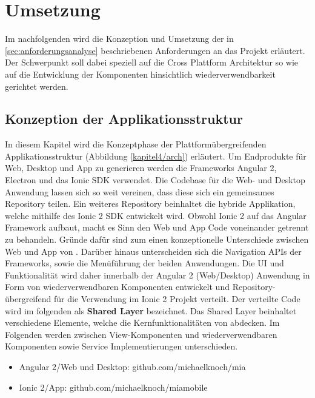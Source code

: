 
\chapter{Umsetzung}
\label{chap:umsetzung}

Im nachfolgenden wird die Konzeption und Umsetzung der in \ref{sec:anforderungsanalyse}
beschriebenen Anforderungen an das Projekt \projectname{} erläutert.
Der Schwerpunkt soll dabei speziell auf die Cross Plattform Architektur so wie auf die
Entwicklung der Komponenten hinsichtlich wiederverwendbarkeit gerichtet werden.


\section{Konzeption der Applikationsstruktur}

In diesem Kapitel wird die Konzeptphase der Plattformübergreifenden Applikationsstruktur (Abbildung \ref{kapitel4/arch}) erläutert.
Um Endprodukte für Web, Desktop und App zu generieren werden die Frameworks Angular 2, Electron und das
Ionic \ac{SDK} verwendet. Die Codebase für die Web- und Desktop Anwendung lassen sich so weit vereinen,
dass diese sich ein gemeinsames Repository teilen. Ein weiteres Repository beinhaltet die hybride Applikation,
welche mithilfe des Ionic 2 \ac{SDK} entwickelt wird. Obwohl Ionic 2 auf das Angular Framework aufbaut,
macht es Sinn den Web und App Code voneinander getrennt zu behandeln.
Gründe dafür sind zum einen konzeptionelle Unterschiede zwischen Web und App von \projectname{}.
Darüber hinaus unterscheiden sich die Navigation APIs der Frameworks, sowie die Menüführung der beiden Anwendungen.
Die \ac{UI} und Funktionalität wird daher innerhalb der Angular 2 (Web/Desktop)
Anwendung in Form von wiederverwendbaren Komponenten entwickelt und
Repository-übergreifend für die Verwendung im Ionic 2 Projekt verteilt.
Der verteilte Code wird im folgenden als \textbf{Shared Layer} bezeichnet.
Das Shared Layer beinhaltet verschiedene Elemente, welche die Kernfunktionalitäten von \projectname{} abdecken.
Im Folgenden werden zwischen View-Komponenten und wiederverwendbaren Komponenten sowie Service Implementierungen unterschieden.


\begin{itemize}
  \item Angular 2/Web und Desktop: github.com/michaelknoch/mia
  \item Ionic 2/App: github.com/michaelknoch/miamobile
\end{itemize}



